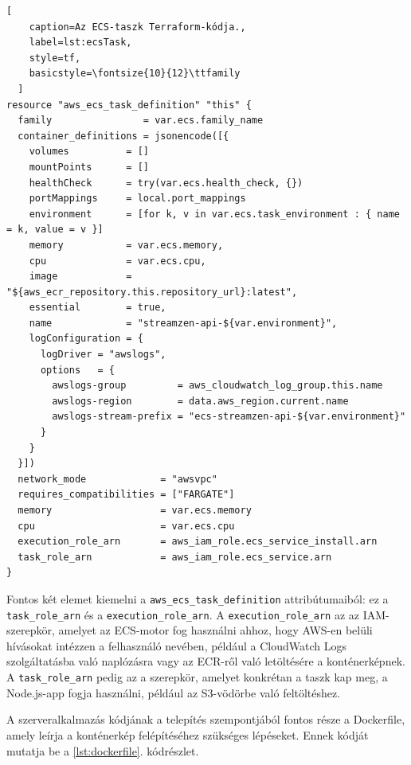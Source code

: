 \begin{minipage}{0.92\textwidth}
  \begin{lstlisting}[
    caption=Az ECS-taszk Terraform-kódja.,
    label=lst:ecsTask,
    style=tf,
    basicstyle=\fontsize{10}{12}\ttfamily
  ]
resource "aws_ecs_task_definition" "this" {
  family                = var.ecs.family_name
  container_definitions = jsonencode([{
    volumes          = []
    mountPoints      = []
    healthCheck      = try(var.ecs.health_check, {})
    portMappings     = local.port_mappings
    environment      = [for k, v in var.ecs.task_environment : { name = k, value = v }]
    memory           = var.ecs.memory,
    cpu              = var.ecs.cpu,
    image            = "${aws_ecr_repository.this.repository_url}:latest",
    essential        = true,
    name             = "streamzen-api-${var.environment}",
    logConfiguration = {
      logDriver = "awslogs",
      options   = {
        awslogs-group         = aws_cloudwatch_log_group.this.name
        awslogs-region        = data.aws_region.current.name
        awslogs-stream-prefix = "ecs-streamzen-api-${var.environment}"
      }
    }
  }])
  network_mode             = "awsvpc"
  requires_compatibilities = ["FARGATE"]
  memory                   = var.ecs.memory
  cpu                      = var.ecs.cpu
  execution_role_arn       = aws_iam_role.ecs_service_install.arn
  task_role_arn            = aws_iam_role.ecs_service.arn
}
\end{lstlisting}
\end{minipage}

Fontos két elemet kiemelni a \verb|aws_ecs_task_definition| attribútumaiból: ez a \verb|task_role_arn| és a \verb|execution_role_arn|. A \verb|execution_role_arn| az az IAM-szerepkör, amelyet az ECS-motor fog használni ahhoz, hogy AWS-en belüli hívásokat intézzen a felhasználó nevében, például a CloudWatch Logs szolgáltatásba való naplózásra vagy az ECR-ről való letöltésére a konténerképnek. A \verb|task_role_arn| pedig az a szerepkör, amelyet konkrétan a taszk kap meg, a Node.js-app fogja használni, például az S3-vödörbe való feltöltéshez.

A szerveralkalmazás kódjának a telepítés szempontjából fontos része a Dockerfile, amely leírja a konténerkép felépítéséhez szükséges lépéseket. Ennek kódját mutatja be a \ref{lst:dockerfile}. kódrészlet.

